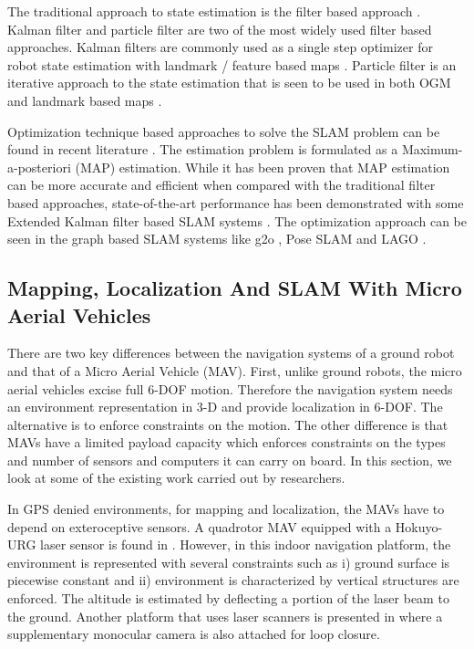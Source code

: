 \documentclass[12pt,a4paper]{report}
\begin{document}
The traditional approach to state estimation is the filter based approach \cite{Cadena2016}. Kalman filter and particle filter are two of the most widely used filter based approaches. Kalman filters are commonly used as a single step optimizer for robot state estimation with landmark / feature based maps \cite{SLAM_Dissa}. Particle filter is an iterative approach to the state estimation that is seen to be used in both OGM and landmark based maps \cite{FastSLAM_Dechter:2002:777092}. \par

Optimization technique based approaches to solve the SLAM problem can be found in recent literature \cite{Sparse-Local-Submap-Joining-Filter-for-Building-Large-Scale-Maps,iSAM:Incremental-Smoothing-and-Mapping}. The estimation problem is formulated as a Maximum-a-posteriori (MAP) estimation. While it has been proven that MAP estimation can be more accurate and efficient when compared with the traditional filter based approaches, state-of-the-art performance has been demonstrated with some Extended Kalman filter based SLAM systems \cite{Cadena2016}. The optimization approach can be seen in the graph based SLAM systems like g2o \cite{g2oKummerle2011}, Pose SLAM \cite{ila2010} and LAGO \cite{doi:10.1177/0278364914523689}.

\subsection{Mapping, Localization And SLAM With Micro Aerial Vehicles}
There are two key differences between the navigation systems of a ground robot and that of a Micro Aerial Vehicle (MAV). First, unlike ground robots, the micro aerial vehicles excise full 6-DOF motion. Therefore the navigation system needs an environment representation in 3-D and provide localization in 6-DOF. The alternative is to enforce constraints on the motion. The other difference is that MAVs have a limited payload capacity which enforces constraints on the types and number of sensors and computers it can carry on board. In this section, we look at some of the existing work carried out by researchers. 

In GPS denied environments, for mapping and localization, the MAVs have to depend on exteroceptive sensors. A quadrotor MAV equipped with a Hokuyo-URG laser sensor is found in \cite{grzonka2012fully}. However, in this indoor navigation platform, the environment is represented with several constraints such as i) ground surface is piecewise constant and ii) environment is characterized by vertical structures are enforced. The altitude is estimated by deflecting a portion of the laser beam to the ground. Another platform that uses laser scanners is presented in \cite{shen2011autonomous} where a supplementary monocular camera is also attached for loop closure. 
\end{document}
